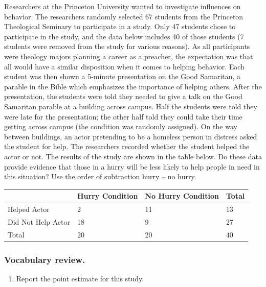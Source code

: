 \documentclass[
]{report}
\providecommand{\tightlist}{%
  \setlength{\itemsep}{0pt}\setlength{\parskip}{0pt}}
\begin{document}
Researchers at the Princeton University wanted to investigate influences on behavior. The researchers randomly selected 67 students from the Princeton Theological Seminary to participate in a study. Only 47 students chose to participate in the study, and the data below includes 40 of those students (7 students were removed from the study for various reasons). As all participants were theology majors planning a career as a preacher, the expectation was that all would have a similar disposition when it comes to helping behavior. Each student was then shown a 5-minute presentation on the Good Samaritan, a parable in the Bible which emphasizes the importance of helping others. After the presentation, the students were told they needed to give a talk on the Good Samaritan parable at a building across campus. Half the students were told they were late for the presentation; the other half told they could take their time getting across campus (the condition was randomly assigned). On the way between buildings, an actor pretending to be a homeless person in distress asked the student for help. The researchers recorded whether the student helped the actor or not. The results of the study are shown in the table below. Do these data provide evidence that those in a hurry will be less likely to help people in need in this situation? Use the order of subtraction hurry -- no hurry.

\begin{longtable}[]{@{}llll@{}}
\toprule
& Hurry Condition & No Hurry Condition & Total \\
\midrule
\endhead
Helped Actor & 2 & 11 & 13 \\
Did Not Help Actor & 18 & 9 & 27 \\
Total & 20 & 20 & 40 \\
\bottomrule
\end{longtable}

\hypertarget{vocabulary-review.-3}{%
\subsubsection*{Vocabulary review.}\label{vocabulary-review.-3}}

\begin{enumerate}
\def\labelenumi{\arabic{enumi}.}
\tightlist
\item
  Report the point estimate for this study.
\end{enumerate}

\vspace{0.4in}
\end{document}
